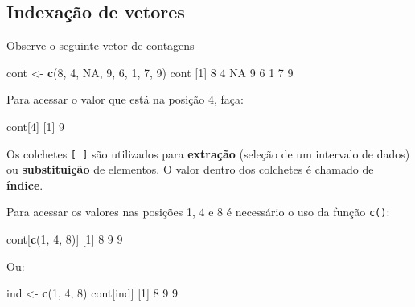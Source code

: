 \documentclass[10pt,a4paper]{book}
\newenvironment{Shaded}{\begin{snugshade}}{\end{snugshade}}
\newcommand{\KeywordTok}[1]{\textcolor[rgb]{0.13,0.29,0.53}{\textbf{#1}}}
\newcommand{\DecValTok}[1]{\textcolor[rgb]{0.00,0.00,0.81}{#1}}
\newcommand{\StringTok}[1]{\textcolor[rgb]{0.31,0.60,0.02}{#1}}
\newcommand{\OtherTok}[1]{\textcolor[rgb]{0.56,0.35,0.01}{#1}}
\newcommand{\NormalTok}[1]{#1}
\begin{document}
\subsection{Indexação de vetores}\label{indexauxe7uxe3o-de-vetores}

Observe o seguinte vetor de contagens

\begin{Shaded}
\begin{Highlighting}[]
\NormalTok{cont <-}\StringTok{ }\KeywordTok{c}\NormalTok{(}\DecValTok{8}\NormalTok{, }\DecValTok{4}\NormalTok{, }\OtherTok{NA}\NormalTok{, }\DecValTok{9}\NormalTok{, }\DecValTok{6}\NormalTok{, }\DecValTok{1}\NormalTok{, }\DecValTok{7}\NormalTok{, }\DecValTok{9}\NormalTok{)}
\NormalTok{cont}
\NormalTok{[}\DecValTok{1}\NormalTok{]  }\DecValTok{8}  \DecValTok{4} \OtherTok{NA}  \DecValTok{9}  \DecValTok{6}  \DecValTok{1}  \DecValTok{7}  \DecValTok{9}
\end{Highlighting}
\end{Shaded}

Para acessar o valor que está na posição 4, faça:

\begin{Shaded}
\begin{Highlighting}[]
\NormalTok{cont[}\DecValTok{4}\NormalTok{]}
\NormalTok{[}\DecValTok{1}\NormalTok{] }\DecValTok{9}
\end{Highlighting}
\end{Shaded}

Os colchetes \texttt{{[}\ {]}} são utilizados para \textbf{extração}
(seleção de um intervalo de dados) ou \textbf{substituição} de
elementos. O valor dentro dos colchetes é chamado de \textbf{índice}.

Para acessar os valores nas posições 1, 4 e 8 é necessário o uso da
função \texttt{c()}:

\begin{Shaded}
\begin{Highlighting}[]
\NormalTok{cont[}\KeywordTok{c}\NormalTok{(}\DecValTok{1}\NormalTok{, }\DecValTok{4}\NormalTok{, }\DecValTok{8}\NormalTok{)]}
\NormalTok{[}\DecValTok{1}\NormalTok{] }\DecValTok{8} \DecValTok{9} \DecValTok{9}
\end{Highlighting}
\end{Shaded}

Ou:

\begin{Shaded}
\begin{Highlighting}[]
\NormalTok{ind <-}\StringTok{ }\KeywordTok{c}\NormalTok{(}\DecValTok{1}\NormalTok{, }\DecValTok{4}\NormalTok{, }\DecValTok{8}\NormalTok{)}
\NormalTok{cont[ind]}
\NormalTok{[}\DecValTok{1}\NormalTok{] }\DecValTok{8} \DecValTok{9} \DecValTok{9}
\end{Highlighting}
\end{Shaded}
\end{document}
